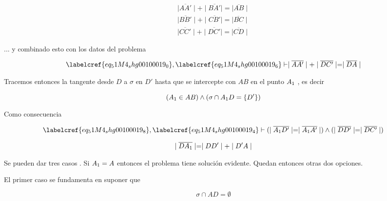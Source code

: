 \begin{equation} \label{eq_51M4_shg00100019_6}
\begin{gathered}
	\mid\overline{AA'}\mid + \mid\overline{BA'}\mid = \mid\overline{AB}\mid \\
	\mid\overline{BB'}\mid + \mid\overline{CB'}\mid = \mid\overline{BC}\mid \\
	\mid\overline{CC'}\mid + \mid\overline{DC'}\mid = \mid\overline{CD}\mid
\end{gathered}
\end{equation}

... y combinado esto con los datos del problema

\begin{equation} \label{eq_51M4_shg00100019_7}
	\labelcref{eq_51M4_shg00100019_0}, \labelcref{eq_51M4_shg00100019_6} \vdash \mid\overline{AA'}\mid + \mid\overline{DC'}\mid = \mid\overline{DA}\mid
\end{equation}

Tracemos entonces la tangente desde $D$ a $\sigma$ en $D'$ hasta que se intercepte con $AB$ en el punto $A\textsubscript{1}$ , es decir

\begin{equation} \label{eq_51M4_shg00100019_8}
	(A\textsubscript{1} \in AB) \land (\sigma \cap A\textsubscript{1}D = \{D'\})\\
\end{equation}

Como consecuencia 

\begin{equation} \label{eq_51M4_shg00100019_9}
\begin{gathered}
	 \labelcref{eq_51M4_shg00100019_8}, \labelcref{eq_51M4_shg00100019_4} \vdash (\mid\overline{A\textsubscript{1}D'}\mid = \mid\overline{A\textsubscript{1}A'}\mid) \land (\mid\overline{DD'}\mid = \mid\overline{DC'}\mid)
\end{gathered}
\end{equation}

\begin{equation} \label{eq_51M4_shg00100019_9a}
	\mid\overline{DA\textsubscript{1}}\mid = \mid DD'\mid + \mid D'A \mid
\end{equation}

Se pueden dar tres casos . Si $A\textsubscript{1} = A$ entonces el problema tiene solución evidente. Quedan entonces otras dos opciones.

El primer caso se fundamenta en suponer que

\begin{equation} \label{eq_51M4_shg00100019_10}
	\sigma \cap AD = \emptyset
\end{equation}

